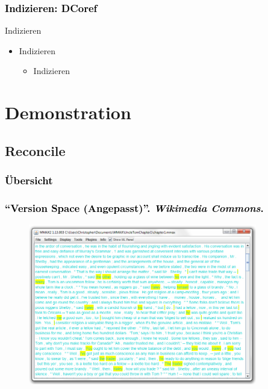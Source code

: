 \documentclass[xcolor=dvipsnames]{beamer}
\begin{document}

\begin{frame}\frametitle{\textcolor{black}{Indizieren: DCoref}}

\begin{block}{Indizieren}
\begin{itemize}
\item Indizieren
\begin{itemize}
\item Indizieren
\end{itemize}
\end{itemize}
\end{block}

\end{frame}


\section{Demonstration}


\subsection{Reconcile}


\begin{frame}[plain]\frametitle{\textcolor{black}{Übersicht}}


\end{frame}

\addtocounter{framenumber}{-1}


\begin{frame}\frametitle{\textcolor{black}{``{Version Space (Angepasst)}''. \emph{Wikimedia Commons}.}}
\begin{figure}
\includegraphics[height=7cm]{cm_mmax.jpg}
\end{figure}

\end{frame}
\end{document}
